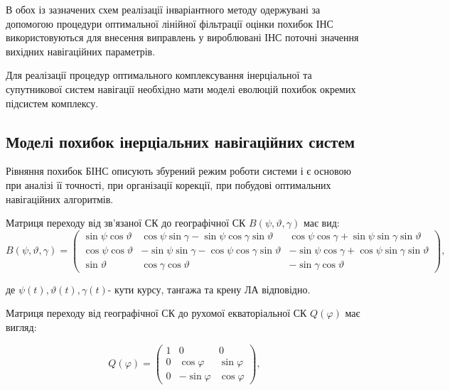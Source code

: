 В обох із зазначених схем реалізації інваріантного методу одержувані за допомогою процедури  
оптимальної лінійної фільтрації оцінки похибок ІНС використовуються для внесення виправлень 
у вироблювані ІНС поточні значення вихідних навігаційних параметрів.

Для реалізації процедур оптимального комплексування  інерціальної та супутникової систем навігації необхідно мати моделі еволюцій похибок окремих підсистем комплексу.


\subsection{Моделі похибок  інерціальних навігаційних систем }

Рівняння похибок БІНС описують збурений режим роботи системи і є основою при аналізі 
її точності, при організації корекції, при побудові оптимальних навігаційних алгоритмів.

Матриця переходу від зв'язаної СК до географічної  СК  $B(\psi ,\vartheta ,\gamma )$ має 
вид:
\begin{equation}
\label{eq:noname_1} 
\scriptstyle
B(\psi ,\vartheta ,\gamma )=\left(
\begin{array}{ccc} 
{\scriptstyle \sin \psi \cos \vartheta } & 
{\scriptstyle\cos \psi \sin \gamma -\sin \psi \cos \gamma \sin \vartheta } & 
{\scriptstyle\cos \psi \cos \gamma +\sin \psi \sin \gamma \sin \vartheta } \\ 
{\scriptstyle\cos \psi \cos \vartheta } & 
{\scriptstyle-\sin \psi \sin \gamma -\cos \psi \cos \gamma \sin \vartheta } & 
{\scriptstyle-\sin \psi \cos \gamma +\cos \psi \sin \gamma \sin \vartheta } \\ 
{\scriptstyle\sin \vartheta } & 
{\scriptstyle\cos \gamma \cos \vartheta } & 
{\scriptstyle-\sin \gamma \cos \vartheta } 
\end{array}\right),
\end{equation}

\begin{ESKDexplanation}
\item де $\psi \left(t\right),\vartheta \left(t\right),\gamma \left(t\right)$- кути курсу, 
тангажа та крену ЛА відповідно. 
\end{ESKDexplanation}
Матриця переходу від географічної  СК до  рухомої 
екваторіальної СК $Q\left(\varphi \right)$ має вигляд:

\[Q\left(\varphi \right)=\left(\begin{array}{ccc} {1} & {0} & {0} \\ 
{0} & {\cos\varphi } & {\sin \varphi } \\ 
{0} & {-\sin \varphi } & {\cos \varphi } \end{array}\right),\] 

